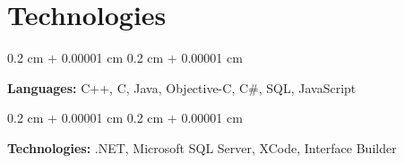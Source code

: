 \documentclass[10pt, letterpaper]{article}
\newenvironment{onecolentry}{
    \begin{adjustwidth}{
        0.2 cm + 0.00001 cm
    }{
        0.2 cm + 0.00001 cm
    }
}{
    \end{adjustwidth}
}
\begin{document}
    
    \section{Technologies}



        
        \begin{onecolentry}
            \textbf{Languages:} C++, C, Java, Objective-C, C\#, SQL, JavaScript
        \end{onecolentry}

        \vspace{0.2 cm}

        \begin{onecolentry}
            \textbf{Technologies:} .NET, Microsoft SQL Server, XCode, Interface Builder
        \end{onecolentry}


    
\end{document}
